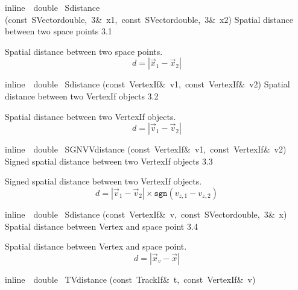 \documentclass{article}
\begin{document}
\begin{cxxentry}
\begin{cxxdoc}
\end{cxxdoc}
\begin{cxxfunction}
{inline\ \ double\ }
        {Sdistance}
        {(const\ SVector\<double,\ 3\>\&\ x1,\ const\ SVector\<double,\ 3\>\&\ x2)}
        {Spatial distance between two space points}
        {3.1}
\begin{cxxdoc}
Spatial distance between two space points.
\begin{displaymath}
d = |\vec{x}_1 - \vec{x}_2|
\end{displaymath}
\end{cxxdoc}
\end{cxxfunction}
\begin{cxxfunction}
{inline\ \ double\ }
        {Sdistance}
        {(const\ VertexIf\&\ v1,\ const\ VertexIf\&\ v2)}
        {Spatial distance between two VertexIf objects}
        {3.2}
\begin{cxxdoc}
Spatial distance between two VertexIf objects.
\begin{displaymath}
d = |\vec{v}_1 - \vec{v}_2|
\end{displaymath}
\end{cxxdoc}
\end{cxxfunction}
\begin{cxxfunction}
{inline\ \ double\ }
        {SGNVVdistance}
        {(const\ VertexIf\&\ v1,\ const\ VertexIf\&\ v2)}
        {Signed spatial distance between two VertexIf objects}
        {3.3}
\begin{cxxdoc}
Signed spatial distance between two VertexIf objects.
\begin{displaymath}
d = |\vec{v}_1 - \vec{v}_2|\times\texttt{sgn}(v_{z,1} - v_{z,2})
\end{displaymath}
\end{cxxdoc}
\end{cxxfunction}
\begin{cxxfunction}
{inline\ \ double\ }
        {Sdistance}
        {(const\ VertexIf\&\ v,\ const\ SVector\<double,\ 3\>\&\ x)}
        {Spatial distance between Vertex and space point}
        {3.4}
\begin{cxxdoc}
Spatial distance between Vertex and space point.
\begin{displaymath}
d = |\vec{x}_v - \vec{x}|
\end{displaymath}
\end{cxxdoc}
\end{cxxfunction}
\begin{cxxfunction}
{inline\ \ double\ }
        {TVdistance}
        {(const\ TrackIf\&\ t,\ const\ VertexIf\&\ v)}

\end{cxxfunction}
\end{cxxentry}
\end{document}
